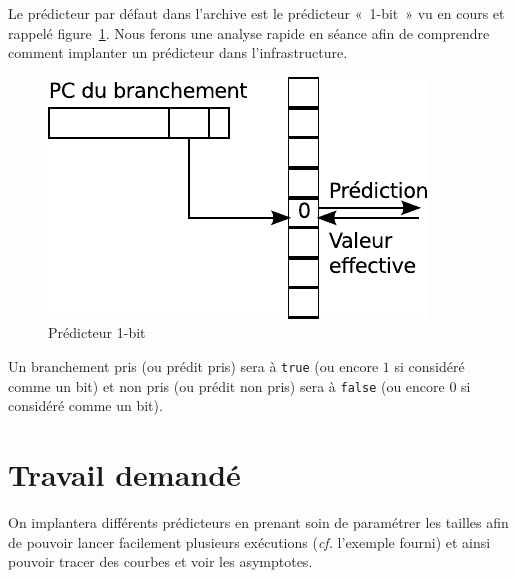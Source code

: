 \documentclass[a4paper]{article}
\begin{document}
Le prédicteur par défaut dans l'archive est le prédicteur «~1-bit~» vu en cours et rappelé figure~\ref{1-bit}.
Nous ferons une analyse rapide en séance afin de comprendre comment implanter un prédicteur dans l'infrastructure.
\begin{figure}[hbt]\center\leavevmode
\includegraphics[scale=.9]{1-bit}
\caption{Prédicteur 1-bit}
\label{1-bit}
\end{figure}
Un branchement pris (ou prédit pris) sera à \verb+true+ (ou encore $1$ si considéré comme un bit) et non pris (ou prédit non pris) sera à \verb+false+ (ou encore $0$ si considéré comme un bit).

\section{Travail demandé}
On implantera différents prédicteurs en prenant soin de paramétrer les tailles afin de pouvoir lancer facilement plusieurs exécutions (\emph{cf.} l'exemple fourni) et ainsi pouvoir tracer des courbes et voir les asymptotes.
\end{document}
